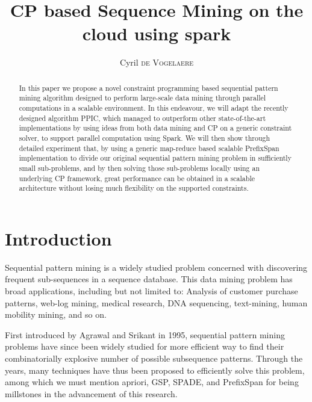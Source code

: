 \documentclass{eplmastersthesis}
\title{CP based Sequence Mining on the cloud using spark}	%
\author{Cyril \textsc{de Vogelaere}}	%
\begin{document}
\begin{singlespacing}
\maketitle					%
\end{singlespacing}

\tableofcontents
\newpage
\listoffigures
\listoftables
\newpage
\listofalgorithms
\newpage

\begin{abstract}
In this paper we propose a novel constraint programming based sequential pattern mining algorithm designed to perform large-scale data mining through parallel computations in a scalable environment. In this endeavour, we will adapt the recently designed algorithm PPIC, which managed to outperform other state-of-the-art implementations by using ideas from both data mining and CP on a generic constraint solver, to support parallel computation using Spark. We will then show through detailed experiment that, by using a generic map-reduce based scalable PrefixSpan implementation to divide our original sequential pattern mining problem in sufficiently small sub-problems, and by then solving those sub-problems locally using an underlying CP framework, great performance can be obtained in a scalable architecture without losing much flexibility on the supported constraints. 
\end{abstract}

\section{Introduction}

Sequential pattern mining is a widely studied problem concerned with discovering frequent sub-sequences in a sequence database. This data mining problem has broad applications, including but not limited to: Analysis of customer purchase patterns, web-log mining, medical research, DNA sequencing, text-mining, human mobility mining, and so on\cite{mabroukeh2010taxonomy}. \newline

First introduced by Agrawal and Srikant \cite{agrawal1995mining} in 1995, sequential pattern mining problems have since been widely studied for more efficient way to find their combinatorially explosive number of possible subsequence patterns. Through the years, many techniques have thus been proposed to efficiently solve this problem, among which we must mention apriori, GSP, SPADE, and PrefixSpan \cite{agrawal1995mining, srikant1996mining, han2001prefixspan, zaki2001spade} for being millstones in the advancement of this research. \newline
\end{document}

